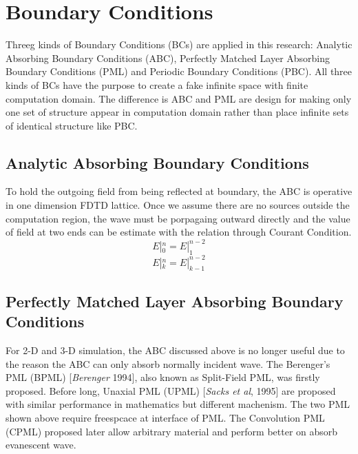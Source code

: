 \section{Boundary Conditions}
\label{sec:bcs}
Threeg kinds of Boundary Conditions (BCs) are applied in this research: Analytic Absorbing Boundary Conditions (ABC),
Perfectly Matched Layer Absorbing Boundary Conditions (PML) and Periodic Boundary Conditions (PBC). All three kinds of
BCs have the purpose to create a fake infinite space with finite computation domain. The difference is ABC and PML are
design for making only one set of structure appear in computation domain rather than place infinite sets of identical
structure like PBC.


\subsection{Analytic Absorbing Boundary Conditions}
To hold the outgoing field from being reflected at boundary, the ABC is operative in one dimension FDTD lattice. Once we
assume there are no sources outside the computation region, the wave must be porpagaing outward directly and the value
of field at two ends can be estimate with the relation through Courant Condition.
\begin{equation}
  E|_0^n = E|_1^{n-2}
\end{equation}
\begin{equation}
  E|_k^n = E|_{k-1}^{n-2}
\end{equation}



\subsection{Perfectly Matched Layer Absorbing Boundary Conditions}
\label{subsec:pml}
For 2-D and 3-D simulation, the ABC discussed above is no longer useful due to the reason the ABC can only absorb
normally incident wave. The Berenger's PML (BPML) [\textit{Berenger} 1994], also known as Split-Field PML, was firstly
proposed. Before long, Unaxial PML (UPML) [\textit{Sacks et al}, 1995] are proposed with similar performance in
mathematics but different machenism. The two PML shown above require freespcace at interface of PML. The Convolution PML
(CPML) proposed later allow arbitrary material and perform better on absorb evanescent wave.

